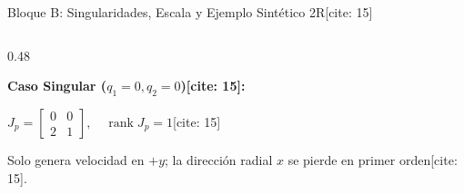 \documentclass[aspectratio=169, xcolor={table,xcdraw}]{beamer}
\begin{document}
\begin{frame}{Bloque B: Singularidades, Escala y Ejemplo Sintético 2R[cite: 15]}
\begin{columns}[T]
\begin{column}{0.48\textwidth}
\begin{tcolorbox}[colback=white, colframe=ucbblue, title=\textbf{Ejemplo Sintético 2R Unitario} {[cite: 15]}, boxsep=0.8mm, top=1mm, bottom=1mm]
                \par\textbf{Caso Singular ($q_1=0, q_2=0$)[cite: 15]:}
                \begin{center}
                    $J_p = \begin{bmatrix} 0 & 0 \\ 2 & 1 \end{bmatrix}, \quad \operatorname{rank}J_p = 1$[cite: 15]
                \end{center}
                Solo genera velocidad en $+y$; la dirección radial $x$ se pierde en primer orden[cite: 15].
            \end{tcolorbox}
        \end{column}
    \end{columns}
\end{frame}
\end{document}

